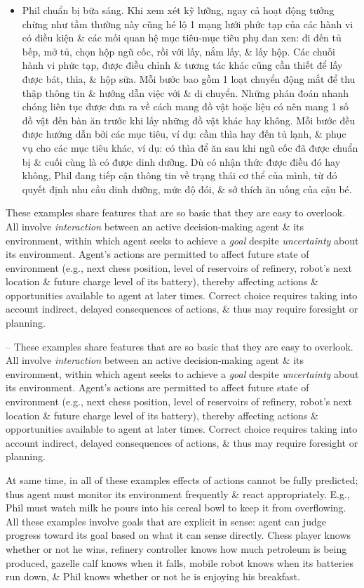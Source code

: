 \documentclass{article}
\begin{document}
\begin{itemize}
\begin{itemize}
\begin{itemize}
            \item Phil chuẩn bị bữa sáng. Khi xem xét kỹ lưỡng, ngay cả hoạt động tưởng chừng như tầm thường này cũng hé lộ 1 mạng lưới phức tạp của các hành vi có điều kiện \& các mối quan hệ mục tiêu-mục tiêu phụ đan xen: đi đến tủ bếp, mở tủ, chọn hộp ngũ cốc, rồi với lấy, nắm lấy, \& lấy hộp. Các chuỗi hành vi phức tạp, được điều chỉnh \& tương tác khác cũng cần thiết để lấy được bát, thìa, \& hộp sữa. Mỗi bước bao gồm 1 loạt chuyển động mắt để thu thập thông tin \& hướng dẫn việc với \& di chuyển. Những phán đoán nhanh chóng liên tục được đưa ra về cách mang đồ vật hoặc liệu có nên mang 1 số đồ vật đến bàn ăn trước khi lấy những đồ vật khác hay không. Mỗi bước đều được hướng dẫn bởi các mục tiêu, ví dụ: cầm thìa hay đến tủ lạnh, \& phục vụ cho các mục tiêu khác, ví dụ: có thìa để ăn sau khi ngũ cốc đã được chuẩn bị \& cuối cùng là có được dinh dưỡng. Dù có nhận thức được điều đó hay không, Phil đang tiếp cận thông tin về trạng thái cơ thể của mình, từ đó quyết định nhu cầu dinh dưỡng, mức độ đói, \& sở thích ăn uống của cậu bé.
        \end{itemize}
        These examples share features that are so basic that they are easy to overlook. All involve {\it interaction} between an active decision-making agent \& its environment, within which agent seeks to achieve a {\it goal} despite {\it uncertainty} about its environment. Agent's actions are permitted to affect future state of environment (e.g., next chess position, level of reservoirs of refinery, robot's next location \& future charge level of its battery), thereby affecting actions \& opportunities available to agent at later times. Correct choice requires taking into account indirect, delayed consequences of actions, \& thus may require foresight or planning.

        -- These examples share features that are so basic that they are easy to overlook. All involve {\it interaction} between an active decision-making agent \& its environment, within which agent seeks to achieve a {\it goal} despite {\it uncertainty} about its environment. Agent's actions are permitted to affect future state of environment (e.g., next chess position, level of reservoirs of refinery, robot's next location \& future charge level of its battery), thereby affecting actions \& opportunities available to agent at later times. Correct choice requires taking into account indirect, delayed consequences of actions, \& thus may require foresight or planning.

        At same time, in all of these examples effects of actions cannot be fully predicted; thus agent must monitor its environment frequently \& react appropriately. E.g., Phil must watch milk he pours into his cereal bowl to keep it from overflowing. All these examples involve goals that are explicit in sense: agent can judge progress toward its goal based on what it can sense directly. Chess player knows whether or not he wins, refinery controller knows how much petroleum is being produced, gazelle calf knows when it falls, mobile robot knows when its batteries run down, \& Phil knows whether or not he is enjoying his breakfast.


\end{itemize}
\end{itemize}
\end{document}

